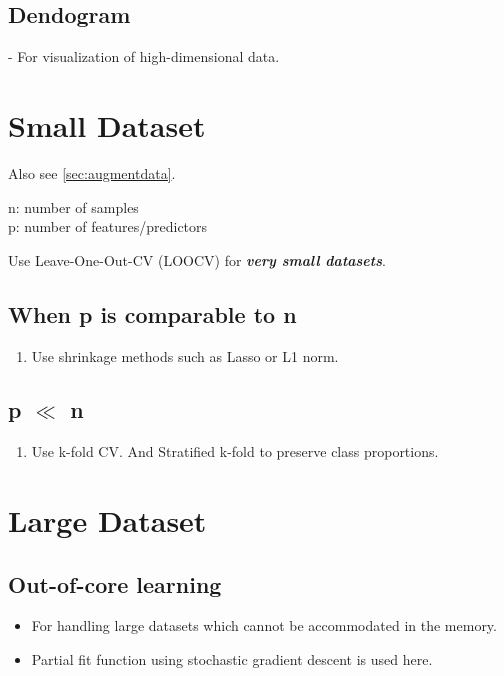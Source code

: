 \documentclass[a4paper, 12pt]{report}
\begin{document}
\subsection{Dendogram}
- For visualization of high-dimensional data.

\section{Small Dataset}
Also see  \autoref{sec:augmentdata}.

\label{smalldatasize}
n: number of samples\\
p: number of features/predictors

Use Leave-One-Out-CV (LOOCV) for \textbf{\textit{very small datasets}}.

\subsection{When p is comparable to n}
\begin{enumerate}

\item Use shrinkage methods such as Lasso or L1 norm.

\end{enumerate}


\subsection{p $\ll$ n}
\begin{enumerate}
\item Use k-fold CV. And Stratified k-fold to preserve class proportions.
\end{enumerate}



\section{Large Dataset}

\subsection{Out-of-core learning}
\label{subsec:outofcorelearning}

\begin{itemize}
\item For handling large datasets which cannot be accommodated in the memory.
\item Partial fit function using stochastic gradient descent is used here.

\end{itemize} 
\end{document}
